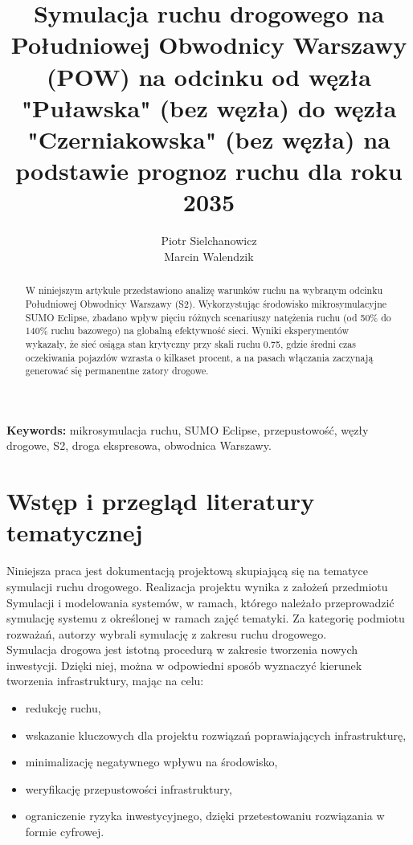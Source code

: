 \documentclass[polish]{projectreport}
\author{Piotr Sielchanowicz \\ Marcin Walendzik}
\title{\textbf{Symulacja ruchu drogowego na Południowej Obwodnicy Warszawy (POW) na odcinku od węzła "Puławska" (bez węzła) do węzła "Czerniakowska" (bez węzła) na podstawie prognoz ruchu dla roku 2035}}
\begin{document}
\maketitle

\thispagestyle{empty}



\vspace{6cm}

\begin{abstract}
W niniejszym artykule przedstawiono analizę warunków ruchu na wybranym odcinku Południowej Obwodnicy Warszawy (S2). Wykorzystując środowisko mikrosymulacyjne SUMO Eclipse, zbadano wpływ pięciu różnych scenariuszy natężenia ruchu (od 50\% do 140\% ruchu bazowego) na globalną efektywność sieci. Wyniki eksperymentów wykazały, że sieć osiąga stan krytyczny przy skali ruchu 0.75, gdzie średni czas oczekiwania pojazdów wzrasta o kilkaset procent, a na pasach włączania zaczynają generować się permanentne zatory drogowe.
\end{abstract}

\vspace{2cm}
\noindent \textbf{Keywords:} mikrosymulacja ruchu, SUMO Eclipse, przepustowość, węzły drogowe, S2, droga ekspresowa, obwodnica Warszawy.


\newpage

\section{Wstęp i przegląd literatury tematycznej}
\label{sec:introduction}

Niniejsza praca jest dokumentacją projektową skupiającą się na tematyce symulacji ruchu drogowego. Realizacja projektu wynika z założeń przedmiotu Symulacji i modelowania systemów, w ramach, którego należało przeprowadzić symulację systemu z określonej w ramach zajęć tematyki. Za kategorię podmiotu rozważań, autorzy wybrali symulację z zakresu ruchu drogowego. \\

Symulacja drogowa jest istotną procedurą w zakresie tworzenia nowych inwestycji. Dzięki niej, można w odpowiedni sposób wyznaczyć kierunek tworzenia infrastruktury, mając na celu:
\begin{itemize}
    \item redukcję ruchu,
    \item wskazanie kluczowych dla projektu rozwiązań poprawiających infrastrukturę,
    \item minimalizację negatywnego wpływu na środowisko,
    \item weryfikację przepustowości infrastruktury,
    \item ograniczenie ryzyka inwestycyjnego, dzięki przetestowaniu rozwiązania w formie cyfrowej.
\end{itemize}
\end{document}
